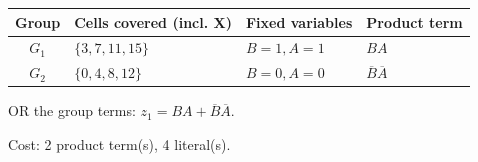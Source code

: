 \documentclass[a4paper,11pt]{article}
\begin{document}
\begin{minipage}{\textwidth}
\begin{center}\small
\begin{tabular}{clll}
\toprule
Group & Cells covered (incl. X) & Fixed variables & Product term\\\midrule
\textcolor{blue!75!black}{$G_{1}$} & $\{3,7,11,15\}$ & $B=1,A=1$ & $BA$\\
\textcolor{red!75!black}{$G_{2}$} & $\{0,4,8,12\}$ & $B=0,A=0$ & $\overline{B}\overline{A}$\\
\bottomrule\end{tabular}\end{center}


\noindent OR the group terms: $\boxed{z_1=BA + \overline{B}\overline{A}}$.

\noindent Cost: 2 product term(s), 4 literal(s).

\end{minipage}\par\vspace{0.25cm}
\end{document}
